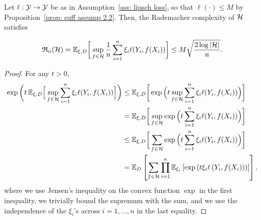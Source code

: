 \documentclass[reqno]{amsart}
\begin{document}
\begin{lemma}\label{lemma: massart's lemma}
    Let $\ell:\mathcal{Y}\to\mathcal{Y}$ be as in Assumption~\ref{ass: lipsch loss}, so that $\ell(\cdot) \le M$ by Proposition~\ref{prop: suff assump 2.2}. Then, the Rademacher complexity of $\mathcal{H}$ satisfies

    \begin{equation}
        \mathfrak R_n(\mathcal{H}) = \mathbb{E}_{\xi,D} \bigg[\sup_{f\in\mathcal{H}} \frac{1}{n}\sum_{i=1}^n \xi_i\ell(Y_i, f(X_i))\bigg] \le M\sqrt{\frac{2\log \vert \mathcal{H} \vert}{n}}.
    \end{equation}

    \begin{proof}
        For any $t>0$,
        \begin{align}
            \exp\bigg(t\, \mathbb{E}_{\xi,D} \Big[\sup_{f\in\mathcal{H}}\sum_{i=1}^n \xi_i \ell(Y_i,f(X_i))\Big]\bigg)
            &\le \mathbb{E}_{\xi,D}\bigg[\exp\Big(t\sup_{f\in\mathcal{H}}\sum_{i=1}^n \xi_i \ell(Y_i,f(X_i))\Big)\bigg]\notag\\
            &= \mathbb{E}_{\xi,D}\bigg[\sup_{f\in\mathcal{H}}\exp\Big(t\sum_{i=1}^n \xi_i \ell(Y_i,f(X_i))\Big)\bigg]\notag\\
            &\le \mathbb{E}_{\xi,D}\bigg[\sum_{f\in\mathcal{H}}\exp\Big(t\sum_{i=1}^n \xi_i \ell(Y_i,f(X_i))\Big)\bigg]\notag\\
            &= \mathbb{E}_D\left[\sum_{f\in\mathcal{H}}\prod_{i=1}^n \mathbb{E}_{\xi_i}\left[\exp\left(t\xi_i \ell\left(Y_i,f(X_i)\right)\right)\right]\right].\label{eq: massart-start}
        \end{align}
        where we use Jensen's inequality on the convex function $\exp$ in the first inequality, we trivially bound the supremum with the sum, and we use the independence of the $\xi_i$'s across $i=1,\ldots,n$ in the last equality. 


\end{proof}
\end{lemma}
\end{document}
